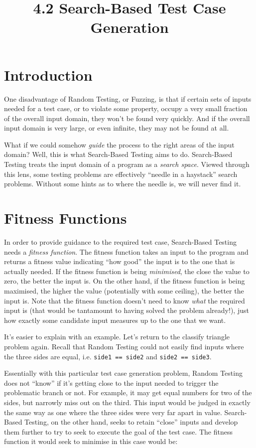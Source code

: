 



\title{4.2 Search-Based Test Case Generation}

\section{Introduction}

One disadvantage of Random Testing, or Fuzzing, is that if certain sets of
inputs needed for a test case, or to violate some property, occupy a very small
fraction of the overall input domain, they won't be found very quickly. And if
the overall input domain is very large, or even infinite, they may not be found
at all.

What if we could somehow {\it guide} the process to the right areas of the input
domain? Well, this is what Search-Based Testing aims to do. Search-Based Testing
treats the input domain of a program as a {\it search space}. Viewed through
this lens, some testing problems are effectively ``needle in a haystack'' search
problems. Without some hints as to where the needle is, we will never find it.

\section{Fitness Functions}
In order to provide guidance to the required test case, Search-Based Testing
needs a {\it fitness function}. The fitness function takes an input to the
program and returns a {fitness value} indicating ``how good'' the input is to
the one that is actually needed. If the fitness function is being {\it
minimised}, the close the value to zero, the better the input is. On the other
hand, if the fitness function is being maximised, the higher the value
(potentially with some ceiling), the better the input is.
%
Note that the fitness function doesn't need to know {\it what} the required
input is (that would be tantamount to having solved the problem already!), just
how exactly some candidate input measures up to the one that we want.

It's easier to explain with an example. Let's return to the classify triangle
problem again. Recall that Random Testing could not easily find inputs where the
three sides are equal, i.e. {\tt side1 == side2} and {\tt side2 == side3}.

Essentially with this particular test case generation problem, Random Testing
does not ``know'' if it's getting close to the input needed to trigger the
problematic branch or not. For example, it may get equal numbers for two of the
sides, but narrowly miss out on the third. This input would be judged in exactly
the same way as one where the three sides were very far apart in value.
Search-Based Testing, on the other hand, seeks to retain ``close'' inputs and
develop them further to try to seek to execute the goal of the test case. 
The fitness function it would seek to minimise in this case would be:

